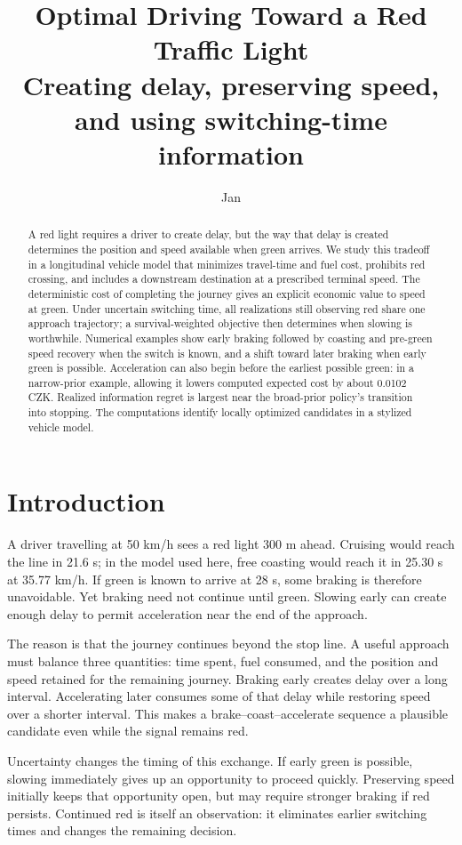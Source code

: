 \documentclass[journal,a4paper,twocolumn]{IEEEtran}
\title{Optimal Driving Toward a Red Traffic Light\\[3pt]
\large Creating delay, preserving speed, and using switching-time information}
\author{Jan}
\begin{document}
\maketitle

\begin{abstract}
A red light requires a driver to create delay, but the way that delay is created determines the position and speed available when green arrives. We study this tradeoff in a longitudinal vehicle model that minimizes travel-time and fuel cost, prohibits red crossing, and includes a downstream destination at a prescribed terminal speed. The deterministic cost of completing the journey gives an explicit economic value to speed at green. Under uncertain switching time, all realizations still observing red share one approach trajectory; a survival-weighted objective then determines when slowing is worthwhile. Numerical examples show early braking followed by coasting and pre-green speed recovery when the switch is known, and a shift toward later braking when early green is possible. Acceleration can also begin before the earliest possible green: in a narrow-prior example, allowing it lowers computed expected cost by about 0.0102 CZK. Realized information regret is largest near the broad-prior policy's transition into stopping. The computations identify locally optimized candidates in a stylized vehicle model.
\end{abstract}

\section{Introduction}
A driver travelling at 50 km/h sees a red light 300 m ahead. Cruising would reach the line in 21.6 s; in the model used here, free coasting would reach it in 25.30 s at 35.77 km/h. If green is known to arrive at 28 s, some braking is therefore unavoidable. Yet braking need not continue until green. Slowing early can create enough delay to permit acceleration near the end of the approach.

The reason is that the journey continues beyond the stop line. A useful approach must balance three quantities: time spent, fuel consumed, and the position and speed retained for the remaining journey. Braking early creates delay over a long interval. Accelerating later consumes some of that delay while restoring speed over a shorter interval. This makes a brake--coast--accelerate sequence a plausible candidate even while the signal remains red.

Uncertainty changes the timing of this exchange. If early green is possible, slowing immediately gives up an opportunity to proceed quickly. Preserving speed initially keeps that opportunity open, but may require stronger braking if red persists. Continued red is itself an observation: it eliminates earlier switching times and changes the remaining decision.
\end{document}

